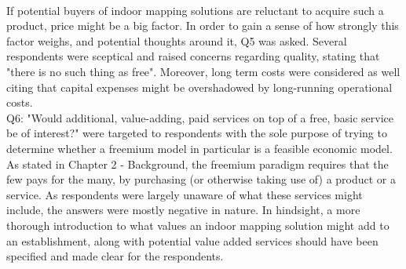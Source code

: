\newline
\\
If potential buyers of indoor mapping solutions are reluctant to acquire such a product, price might be a big factor. In order to gain a sense of how strongly this factor weighs, and potential thoughts around it, Q5 was asked. Several respondents were sceptical and raised concerns regarding quality, stating that "there is no such thing as free". Moreover, long term costs were considered as well citing that capital expenses might be overshadowed by long-running operational costs. 
\newline
\\
Q6: "Would additional, value-adding, paid services on top of a free, basic service be of interest?" were targeted to respondents with the sole purpose of trying to determine whether a freemium model in particular is a feasible economic model. As stated in Chapter 2 - Background, the freemium paradigm requires that the few pays for the many, by purchasing (or otherwise taking use of) a product or a service. As respondents were largely unaware of what these services might include, the answers were mostly negative in nature. In hindsight, a more thorough introduction to what values an indoor mapping solution might add to an establishment, along with potential value added services should have been specified and made clear for the respondents. 

